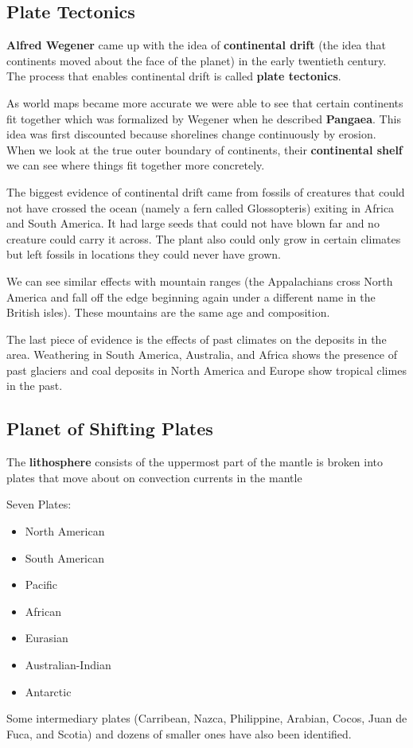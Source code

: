 \documentclass{article}
\begin{document}
\subsection*{Plate Tectonics} %
\label{sub:plate_tectonics}
\textbf{Alfred Wegener} came up with the idea of \textbf{continental drift} (the idea that continents moved about the face of the planet) in the early twentieth century. The process that enables continental drift is called \textbf{plate tectonics}.

As world maps became more accurate we were able to see that certain continents fit together which was formalized by Wegener when he described \textbf{Pangaea}. This idea was first discounted because shorelines change continuously by erosion. When we look at the true outer boundary of continents, their \textbf{continental shelf} we can see where things fit together more concretely.

The biggest evidence of continental drift came from fossils of creatures that could not have crossed the ocean (namely a fern called Glossopteris) exiting in Africa and South America. It had large seeds that could not have blown far and no creature could carry it across. The plant also could only grow in certain climates but left fossils in locations they could never have grown.

We can see similar effects with mountain ranges (the Appalachians cross North America and fall off the edge beginning again under a different name in the British isles). These mountains are the same age and composition.

The last piece of evidence is the effects of past climates on the deposits in the area. Weathering in South America, Australia, and Africa shows the presence of past glaciers and coal deposits in North America and Europe show tropical climes in the past.

\subsection*{Planet of Shifting Plates} %
\label{sub:planet_of_shifting_plates}
The \textbf{lithosphere} consists of the uppermost part of the mantle is broken into plates that move about on convection currents in the mantle

Seven Plates:
\begin{itemize}
    \item North American
    \item South American
    \item Pacific
    \item African
    \item Eurasian
    \item Australian-Indian
    \item Antarctic
\end{itemize}
Some intermediary plates (Carribean, Nazca, Philippine, Arabian, Cocos, Juan de Fuca, and Scotia) and dozens of smaller ones have also been identified.
\end{document}
